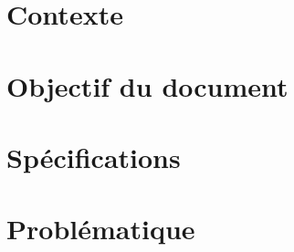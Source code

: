 \section{Contexte}

\section{Objectif du document}

\section{Spécifications}

\section{Problématique}

